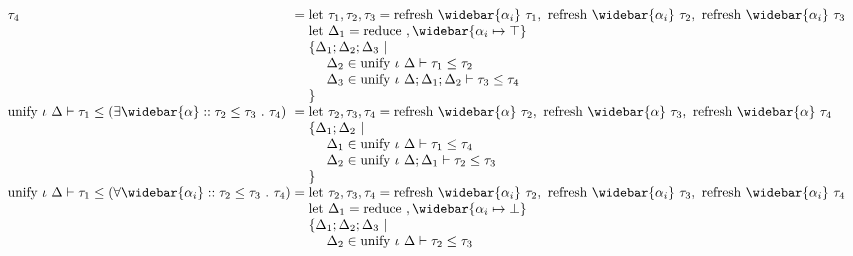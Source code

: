 \documentclass[manuscript]{acmart}
\begin{document}
\[\begin{array}{l @{} l}
    \tau_4
    &{} = 
    \begin{array}[t]{@{} l}
      \text{let } \tau_1, \tau_2, \tau_3 = 
      \text{refresh } \widebar{\alpha_i}\ \tau_1,\ 
      \text{refresh } \widebar{\alpha_i}\ \tau_2,\ 
      \text{refresh } \widebar{\alpha_i}\ \tau_3
      \\
      \text{let } \Delta_1 = \text{reduce}\ , \widebar{\alpha_i \mapsto \top}
      \\
      \{\Delta_1;\Delta_2;\Delta_3\ |
      \\ 
      \ \ \ \ \Delta_2 \in \text{unify } \iota\ \Delta \vdash \tau_1 \leq \tau_2
      \\
      \ \ \ \ \Delta_3 \in \text{unify } \iota\ \Delta;\Delta_1;\Delta_2 \vdash \tau_3 \leq \tau_4
      \\
      \}
    \end{array}
    \\
    \text{unify } \iota\ \Delta \vdash
    \tau_1
    \leq 
    (\exists \widebar{\alpha} :: \tau_2 \leq \tau_3\ .\ \tau_4)
    &{} = 
    \begin{array}[t]{@{} l}
      \text{let } \tau_2, \tau_3, \tau_4 = 
      \text{refresh } \widebar{\alpha}\ \tau_2,\ 
      \text{refresh } \widebar{\alpha}\ \tau_3,\ 
      \text{refresh } \widebar{\alpha}\ \tau_4
      \\
      \{\Delta_1;\Delta_2\ |
      \\ 
      \ \ \ \ \Delta_1 \in \text{unify } \iota\ \Delta \vdash \tau_1 \leq \tau_4
      \\
      \ \ \ \ \Delta_2 \in \text{unify } \iota\ \Delta;\Delta_1 \vdash \tau_2 \leq \tau_3
      \\
      \}
    \end{array}
    \\
    \text{unify } \iota\ \Delta \vdash
    \tau_1
    \leq 
    (\forall \widebar{\alpha_i} :: \tau_2 \leq \tau_3\ .\ \tau_4)
    &{} = 
    \begin{array}[t]{@{} l}
      \text{let } \tau_2, \tau_3, \tau_4 = 
      \text{refresh } \widebar{\alpha_i}\ \tau_2,\ 
      \text{refresh } \widebar{\alpha_i}\ \tau_3,\ 
      \text{refresh } \widebar{\alpha_i}\ \tau_4
      \\
      \text{let } \Delta_1 = \text{reduce}\ , \widebar{\alpha_i \mapsto \bot}
      \\
      \{\Delta_1;\Delta_2;\Delta_3\ |
      \\ 
      \ \ \ \ \Delta_2 \in \text{unify } \iota\ \Delta \vdash \tau_2 \leq \tau_3
      \\

\end{array}
\end{array}\]
\end{document}
